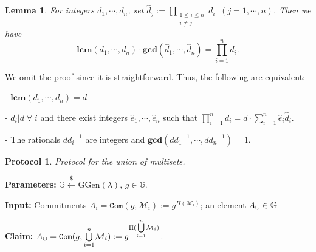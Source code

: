 \documentclass[11pt, lettersize, notitlepage, leqno, footskip=0.6cm]{article}
\newcommand{\pl}{\prod\limits}
\newcommand{\slim}{\sum\limits}
\newcommand{\ttt}{\texttt}
\newcommand{\mc}{\mathcal}
\newcommand{\mb}{\mathbb}
\newcommand{\mbf}{\mathbf}
\newcommand{\mr}{\mathrm}
\newcommand{\lamb}{\lambda}
\newcommand{\what}{\widehat}
\newcommand{\vs}{\vspace{-0.15cm}}
\newcommand{\noin}{\noindent}
\newcommand{\LCM}{\mbf{lcm}}
\newcommand{\GCD}{\mbf{gcd}}
\newtheorem{Lem}[Thm]{Lemma}
\newtheorem{Prot}[Thm]{Protocol}
\numberwithin{equation}{section}
\begin{document}
\begin{Lem} For integers $d_1,\cdots,d_n$, set $\what{d}_j:= \pl_{\substack{1\leq i\leq n \\ i\neq j}} d_i \;\;(j=1,\cdots,n)$. Then we have \vspace{-0.3cm} $$ \LCM(d_1,\cdots,d_n)\cdot \GCD(\what{d}_1,\cdots,\what{d}_n) = \pl_{i=1}^n d_i.$$ \end{Lem}

\noin We omit the proof since it is straightforward. Thus, the following are equivalent:\vspace{0.1cm}

\noin - $\LCM(d_1,\cdots,d_n) = d$

\noin - $d_i\big| d\;\forall\; i$ and there exist integers $\what{e}_1,\cdots,\what{e}_n$ such that $\prod_{i=1}^n d_i  =  d\cdot\sum_{i=1}^n \what{e}_i\what{d}_i.$

\noin - The rationals ${d}{d_i}^{-1}$ are integers and $\GCD({d}{d_1}^{-1},\cdots,{d}{d_n}^{-1}) = 1 .$

\vspace{0.2cm}

\begin{comment}
Let $p$ be a prime and let $\mr{val}_p(N)$ denote the largest integer $x$ such that $p^x$ divides $N$. Write $k_i:= \mr{val}_p(d_i)$ for brevity. Then $\mr{val}_p(\pl_{i=1}^n d_i) = \slim_{i=1}^n k_i$ and $\mr{val}_p(\what{d}_j) = (\slim_{i=1}^n k_i)-k_i$. Hence, \vs $$\mr{val}_p(\GCD(\what{d}_1,\cdots,\what{d}_n)) = \min\big((\slim_{i=1}^n k_i)-k_i\big)_i = \slim_{i=1}^n k_i - \max(k_1,\cdots,k_n).$$ On the other hand, \vs $$\mr{val}_p(\LCM(d_1,\cdots,d_n)) = \max(k_1,\cdots,k_n).$$ Thus, \vs $$\mr{val}_p(\LCM(d_1,\cdots,d_n))+ \mr{val}_p(\GCD(\what{d}_1,\cdots,\what{d}_n)) = \mr{val}_p(\pl_{i=1}^n d_i),$$ which completes the proof. \end{comment}





\begin{Prot} Protocol for the union of multisets.\end{Prot} \vspace{-0.3cm}

\noin \textbf{Parameters:} $\mb{G}\xleftarrow{\$} \mr{GGen}(\lamb)$,\; $g\in \mb{G}$.

\noin \textbf{Input:} Commitments $A_i = \ttt{Com}(g, \mc{M}_i) := g^{\Pi(\mc{M}_i)}$; an element $A_{\tt{\cup}}\in\mb{G}$\vs

\noin \textbf{Claim:} $A_{\tt{\cup}} = \protect{\verb|Com|}(g, {\bigcup\limits_{i=1}^n} \mc{M}_i) := g^{\Pi({\bigcup\limits_{i=1}^n} \mc{M}_i)}$. \vs
\end{document}
